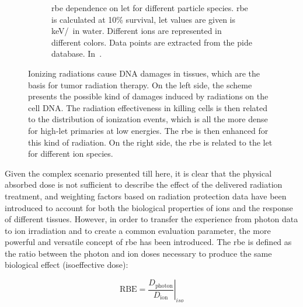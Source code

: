 \begin{figure}
\begin{subfigure}[t]{.58\textwidth}
\caption{\gls{rbe} dependence on \gls{let} for different particle species. \gls{rbe} is calculated at 10\% survival, \gls{let} values are given is keV/\charmum  ~in water. Different ions are represented in different colors. Data points are extracted from the \gls{pide} database. In~\cite{Durante2016}.}
\label{chap1::fig::rbelet}
\end{subfigure}
\caption{Ionizing radiations cause DNA damages in tissues, which are the basis for tumor radiation therapy. On the left side, the scheme presents the possible kind of damages induced by radiations on the cell DNA. The radiation effectiveness in killing cells is then related to the distribution of ionization events, which is all the more dense for high-\gls{let} primaries at low energies. The \gls{rbe} is then enhanced for this kind of radiation. On the right side, the \gls{rbe} is related to the \gls{let} for different ion species.}
\label{chap1::fig::NuclearInt}
\end{figure}
     
Given the complex scenario presented till here, it is clear that the physical absorbed dose is not sufficient to describe the effect of the delivered radiation treatment, and weighting factors based on radiation protection data have been introduced to account for both the biological properties of ions and the response of different tissues. However,  in order to transfer the experience from photon data to ion irradiation and to create a common evaluation parameter, the more powerful and versatile concept of \gls{rbe} has been introduced. The \gls{rbe} is defined as the ratio between the photon and ion doses necessary to produce the same biological effect (isoeffective dose):

\begin{equation}
\left. \mathrm{RBE} = \frac{D_{\mathrm{photon}}}{D_{\mathrm{ion}}}\right|_{iso}
\label{chap1::eq::rbeDef}
\end{equation}


